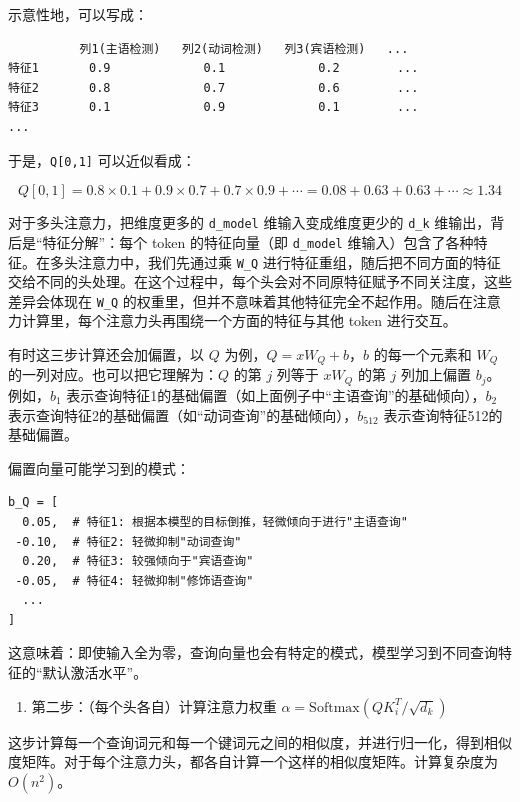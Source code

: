 示意性地，可以写成：

\begin{verbatim}
          列1(主语检测)   列2(动词检测)   列3(宾语检测)   ...
特征1       0.9             0.1             0.2        ...
特征2       0.8             0.7             0.6        ...
特征3       0.1             0.9             0.1        ...
...
\end{verbatim}

于是，\texttt{Q{[}0,1{]}} 可以近似看成：

\[
Q[0,1] = 0.8 \times 0.1 + 0.9 \times 0.7 + 0.7 \times 0.9 + \cdots = 0.08 + 0.63 + 0.63 + \cdots \approx 1.34
\]

对于多头注意力，把维度更多的 \texttt{d\_model} 维输入变成维度更少的 \texttt{d\_k} 维输出，背后是``特征分解''：每个 token 的特征向量（即 \texttt{d\_model} 维输入）包含了各种特征。在多头注意力中，我们先通过乘 \texttt{W\_Q} 进行特征重组，随后把不同方面的特征交给不同的头处理。在这个过程中，每个头会对不同原特征赋予不同关注度，这些差异会体现在 \texttt{W\_Q} 的权重里，但并不意味着其他特征完全不起作用。随后在注意力计算里，每个注意力头再围绕一个方面的特征与其他 token 进行交互。

有时这三步计算还会加偏置，以 \(Q\) 为例，\(Q=xW_Q+b\)，\(b\) 的每一个元素和 \(W_Q\) 的一列对应。也可以把它理解为：\(Q\) 的第 \(j\) 列等于 \(xW_Q\) 的第 \(j\) 列加上偏置 \(b_j\)。例如，\(b_1\) 表示查询特征1的基础偏置（如上面例子中``主语查询''的基础倾向），\(b_2\) 表示查询特征2的基础偏置（如``动词查询''的基础倾向），\(b_{512}\) 表示查询特征512的基础偏置。

偏置向量可能学习到的模式：

\begin{verbatim}
b_Q = [
  0.05,  # 特征1: 根据本模型的目标倒推，轻微倾向于进行"主语查询"
 -0.10,  # 特征2: 轻微抑制"动词查询"
  0.20,  # 特征3: 较强倾向于"宾语查询"
 -0.05,  # 特征4: 轻微抑制"修饰语查询"
  ...
]
\end{verbatim}

这意味着：即使输入全为零，查询向量也会有特定的模式，模型学习到不同查询特征的``默认激活水平''。

\begin{enumerate}
\def\labelenumi{\arabic{enumi}.}
\setcounter{enumi}{1}
\tightlist
\item
  第二步：（每个头各自）计算注意力权重 \(\alpha=\mathrm{Softmax}\left(QK_i^T/\sqrt{d_k}\right)\)
\end{enumerate}

这步计算每一个查询词元和每一个键词元之间的相似度，并进行归一化，得到相似度矩阵。对于每个注意力头，都各自计算一个这样的相似度矩阵。计算复杂度为 \(O(n^2)\)。

